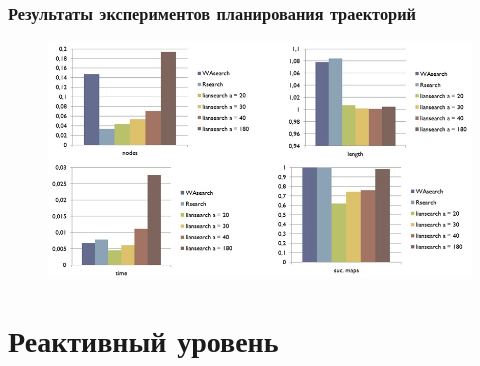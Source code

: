 \documentclass[default]{beamer}
\begin{document}
	\begin{frame}
		\frametitle{Результаты экспериментов планирования траекторий}
		\begin{figure}
			\includegraphics[width=\textwidth]{exp_plan_1.jpg}
		\end{figure}
	\end{frame}
	
	\section{Реактивный уровень}
	
\end{document}
